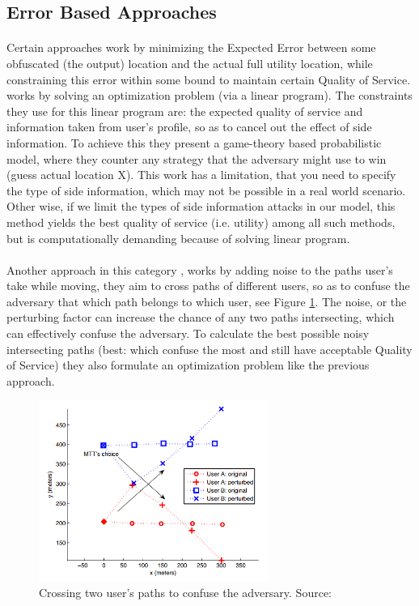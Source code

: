 \documentclass[12pt]{report}
\begin{document}
\subsection{Error Based Approaches}
\paragraph{}
Certain approaches work by minimizing the Expected Error between some obfuscated (the output) location and the actual full utility location, while constraining this error within some bound to maintain certain Quality of Service. \cite{shokri2012protecting} works by solving an optimization problem (via a linear program). The constraints they use for this linear program are: the expected quality of service and information taken from user's profile, so as to cancel out the effect of side information. To achieve this they present a game-theory based probabilistic model, where they counter any strategy that the adversary might use to win (guess actual location X). This work has a limitation, that you need to specify the type of side information, which may not be possible in a real world scenario. Other wise, if we limit the types of side information attacks in our model, this method yields the best quality of service (i.e. utility) among all such methods, but is computationally demanding because of solving linear program.



\paragraph{}
Another approach in this category \cite{hoh2005protecting}, works by adding noise to the paths user's take while moving, they aim to cross paths of different users, so as to confuse the adversary that which path belongs to which user, see Figure \ref{fig:pathConfusion}. The noise, or the perturbing factor can increase the chance of any two paths intersecting, which can effectively confuse the adversary. To calculate the best possible noisy intersecting paths (best: which confuse the most and still have acceptable Quality of Service) they also formulate an optimization problem like the previous approach. 
\begin{figure}[ht]
\centering
        \includegraphics[width=75mm,scale=0.5]{Images/PathConfusion.PNG}
    \caption{Crossing two user's paths to confuse the adversary. Source:\cite{hoh2005protecting}}
    \label{fig:pathConfusion}
\end{figure}
\end{document}
